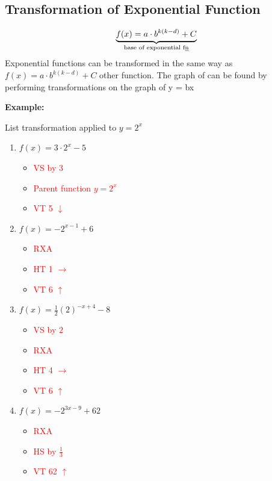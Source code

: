 \documentclass[12pt,a4paper]{article}
\newenvironment{example}
  {\begin{framed}\colorbox{examplecolor}{
  \parbox{\dimexpr\linewidth-2\fboxsep}{
  \textbf{Example:}}}}
  {\end{framed}}
\begin{document}
\subsection{Transformation of Exponential Function}
\begin{equation*}
    \underbrace{f(x)=a \cdot b ^{k(k-d)}+C}_{\text{base of exponential f\underline{n}}}
\end{equation*}
Exponential functions can be transformed in the same way as $f(x)=a \cdot b ^{k(k-d)}+C$
other function. The graph of can be found by
performing transformations on the graph of y = bx
\begin{example}
    List transformation applied to \(y=2^x\)
    \begin{enumerate}
        \item \(f(x)=3 \cdot 2^x-5\)
        \begin{itemize}
            \item \textcolor{red}{VS by 3}
            \item \textcolor{red}{Parent function \(y=2^x\)}
            \item \textcolor{red}{VT 5 \(\downarrow\)}
        \end{itemize}
        \item \(f(x)=-2^{x-1}+6\)
        \begin{itemize}
            \item \textcolor{red}{RXA}
            \item \textcolor{red}{HT 1 \(\to\)}
            \item \textcolor{red}{VT 6 \(\uparrow\)}
        \end{itemize}
        \item \(f(x)=\frac{1}{2}(2)^{-x+4} -8\)
        \begin{itemize}
            \item \textcolor{red}{VS by 2}
            \item \textcolor{red}{RXA}
            \item \textcolor{red}{HT 4 \(\to\)}
            \item \textcolor{red}{VT 6 \(\uparrow\)}
        \end{itemize}
        \item \(f(x)=-2^{3x-9}+62\)
        \begin{itemize}
            \item \textcolor{red}{RXA}
            \item \textcolor{red}{HS by \(\frac{1}{3}\)}
            \item \textcolor{red}{VT 62 \(\uparrow\)}
        \end{itemize} 
    \end{enumerate}
\end{example}
\end{document}
